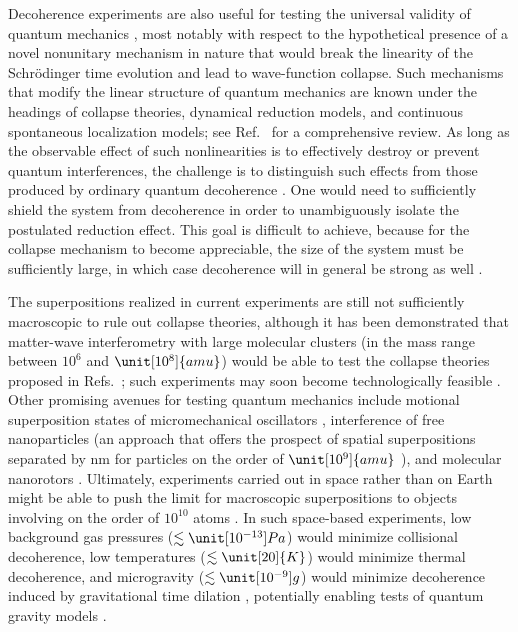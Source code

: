 \documentclass[3p,sort&compress,12pt]{elsarticle}
\begin{document}
Decoherence experiments are also useful for testing the universal validity of quantum mechanics \cite{Leggett:2002:uy,Marshall:2003:om,Bassi:2005:om,Pikovski:2012:aa,Arndt:2014:oo,Wan:2016:oo,Kaltenbaek:2016:pp,Stickler:2018:ii}, most notably with respect to the hypothetical presence of a novel nonunitary mechanism in nature that would break the linearity of the Schr\"odinger time evolution and lead to wave-function collapse. Such mechanisms that modify the linear structure of quantum mechanics are known under the headings of collapse theories, dynamical reduction models, and continuous spontaneous localization models; see Ref.~\cite{Bassi:2003:yb} for a comprehensive review. As long as the observable effect of such nonlinearities is to effectively destroy or prevent quantum interferences, the challenge is to distinguish such effects from those produced by ordinary quantum decoherence \cite{Adler:2007:um,Bassi:2010:aa}. One would need to sufficiently shield the system from decoherence in order to unambiguously isolate the postulated reduction effect. This goal is difficult to achieve, because for the collapse mechanism to become appreciable, the size of the system must be sufficiently large, in which case decoherence will in general be strong as well \cite{Tegmark:1993:uz,Nimmrichter:2013:aa}. 

The superpositions realized in current experiments are still not sufficiently macroscopic to rule out collapse theories, although it has been demonstrated \cite{Nimmrichter:2011:pr} that matter-wave interferometry with large molecular clusters (in the mass range between $10^6$ and $\unit[10^8]{amu}$) would be able to test the collapse theories proposed in Refs.~\cite{Adler:2007:um,Bassi:2010:aa}; such experiments may soon become technologically feasible \cite{Hornberger:2012:ii,Arndt:2014:oo}. Other promising avenues for testing quantum mechanics include motional superposition states of micromechanical oscillators \cite{Marshall:2003:om,Pikovski:2012:aa}, interference of free nanoparticles \cite{Romero:2011:aa,Wan:2016:oo} (an approach that offers the prospect of spatial superpositions separated by \unit[100]{nm} for particles on the order of $\unit[10^9]{amu}$ \cite{Wan:2016:oo}), and molecular nanorotors \cite{Stickler:2018:ii}. Ultimately, experiments carried out in space rather than on Earth might be able to push the limit for macroscopic superpositions to objects involving on the order of $10^{10}$ atoms \cite{Kaltenbaek:2016:pp}. In such space-based experiments, low background gas pressures ($\lesssim \unit[10^{-13}]{Pa}$) would minimize collisional decoherence, low temperatures ($\lesssim \unit[20]{K}$) would minimize thermal decoherence, and microgravity ($\lesssim \unit[10^{-9}]{g}$) would minimize decoherence induced by gravitational time dilation \cite{Pikovski:2015:oo}, potentially enabling tests of quantum gravity models \cite{Kaltenbaek:2016:pp}.
\end{document}
